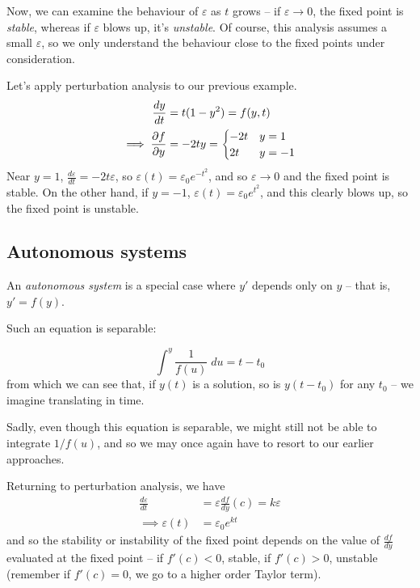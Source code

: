 \documentclass{../../template/note}
\begin{document}
    Now, we can examine the behaviour of \(\varepsilon\) as \(t\) grows -- if \(\varepsilon \to 0\), the fixed point is \emph{stable}, whereas if \(\varepsilon\) blows up, it's \emph{unstable}. Of course, this analysis assumes a small \(\varepsilon\), so we only understand the behaviour close to the fixed points under consideration.

    \begin{example}
        Let's apply perturbation analysis to our previous example.
        \begin{align*}
            \frac{dy}{dt} &= t(1-y^2) = f(y, t) \\
            \implies \pd{f}{y} &= -2ty = \begin{cases}
                -2t & y = 1 \\
                2t & y = -1
            \end{cases}
        \end{align*}
        Near \(y=1\), \(\frac{d\varepsilon}{dt} = -2t\varepsilon\), so \(\varepsilon(t) = \varepsilon_0 e^{-t^2}\), and so \(\varepsilon \to 0\) and the fixed point is stable. On the other hand, if \(y=-1\), \(\varepsilon(t) = \varepsilon_0 e^{t^2}\), and this clearly blows up, so the fixed point is unstable.    
    \end{example}
    
    \subsection{Autonomous systems}

    An \emph{autonomous system} is a special case where \(y'\) depends only on \(y\) -- that is, \(y' = f(y)\).

    Such an equation is separable:

    \[
        \int^y \frac{1}{f(u)} \; du = t - t_0
    \]
    from which we can see that, if \(y(t)\) is a solution, so is \(y(t - t_0)\) for any \(t_0\) -- we imagine translating in time.

    Sadly, even though this equation is separable, we might still not be able to integrate \(1/f(u)\), and so we may once again have to resort to our earlier approaches.

    Returning to perturbation analysis, we have
    \begin{align*}
        \frac{d\varepsilon}{dt} &= \varepsilon \frac{df}{dy}(c) = k\varepsilon \\
        \implies \varepsilon(t) &= \varepsilon_0 e^{kt}
    \end{align*}
    and so the stability or instability of the fixed point depends on the value of \(\frac{df}{dy}\) evaluated at the fixed point -- if \(f'(c) < 0\), stable, if \(f'(c) > 0\), unstable (remember if \(f'(c) = 0\), we go to a higher order Taylor term).
    
\end{document}
